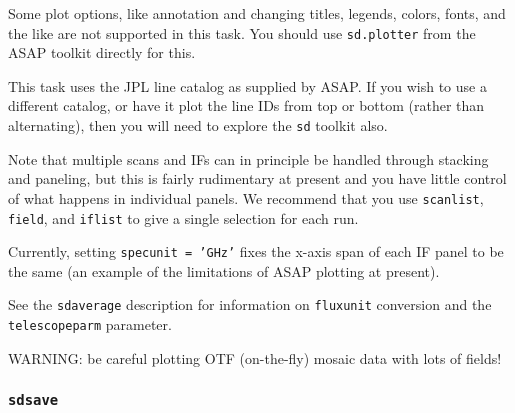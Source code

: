     Some plot options, like annotation and changing titles,
    legends, colors, fonts, and the like are not supported
    in this task.  You should use {\tt sd.plotter} from the ASAP
    toolkit directly for this.
    
    This task uses the JPL line catalog as supplied by ASAP.
    If you wish to use a different catalog, or have it plot
    the line IDs from top or bottom (rather than alternating),
    then you will need to explore the {\tt sd} toolkit also.	
    
    Note that multiple scans and IFs can in principle be handled
    through stacking and paneling, but this is fairly rudimentary
    at present and you have little control of what happens in
    individual panels.  We recommend that you use {\tt scanlist}, 
    {\tt field}, and {\tt iflist} to give a single selection for each run.
    
    Currently, setting {\tt specunit = 'GHz'} fixes the x-axis span of
    each IF panel to be the same (an example of the limitations
    of ASAP plotting at present).
    
    See the {\tt sdaverage} description for information on {\tt fluxunit} 
    conversion and the {\tt telescopeparm} parameter.

    WARNING: be careful plotting OTF (on-the-fly) mosaic data with 
    lots of fields!

\subsubsection{{\tt sdsave}}
\label{section:sd.sdtasks.tasks.sdsave}

